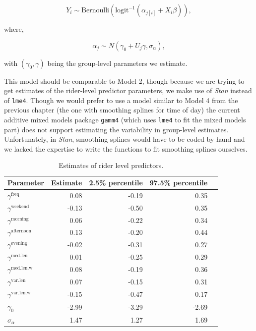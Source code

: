 \documentclass[12pt,twoside]{reedthesis}
\begin{document}
  \begin{equation}
  Y_i \sim \text{Bernoulli} \left( \text{logit}^{-1}
  (\alpha_{j[i]} + X_i \beta) \right),
  \end{equation}
  
  where,
  
  \begin{equation}
  \alpha_j \sim N(\gamma_0 + U_j \gamma, \sigma_\alpha),
  \end{equation}
  
  with \((\gamma_0, \gamma)\) being the group-level parameters we
  estimate.
  
  This model should be comparable to Model 2, though because we are trying
  to get estimates of the rider-level predictor parameters, we make use of
  \textit{Stan} instead of \texttt{lme4}. Though we would prefer to use a
  model similar to Model 4 from the previous chapter (the one with
  smoothing splines for time of day) the current additive mixed models
  package \texttt{gamm4} (which uses \texttt{lme4} to fit the mixed models
  part) does not support estimating the variability in group-level
  estimates. Unfortunately, in \textit{Stan}, smoothing splines would have
  to be coded by hand and we lacked the expertise to write the functions
  to fit smoothing splines ourselves.
  
  \begin{table}[htb]
  \caption{Estimates of rider level predictors. \label{tab:rider-level-estimates}}
  \centering
  \begin{tabular}{lrrrr}
  \toprule
  \textbf{Parameter} & \textbf{Estimate} & \textbf{2.5\% percentile} & \textbf{97.5\% percentile}\\
  \midrule
  $\gamma^\text{freq}$ & 0.08 & -0.19 & 0.35\\
  $\gamma^\text{weekend}$ & -0.13 & -0.50 & 0.35\\
  $\gamma^\text{morning}$ & 0.06 & -0.22 & 0.34\\
  $\gamma^\text{afternoon}$ & 0.13 & -0.20 & 0.44\\
  $\gamma^\text{evening}$ & -0.02 & -0.31 & 0.27\\
  $\gamma^\text{med.len}$ & 0.01 & -0.25 & 0.29\\
  $\gamma^\text{med.len.w}$ & 0.08 & -0.19 & 0.36\\
  $\gamma^\text{var.len}$ & 0.07 & -0.15 & 0.31\\
  $\gamma^\text{var.len.w}$ & -0.15 & -0.47 & 0.17\\
  $\gamma_0$ & -2.99 & -3.29 & -2.69\\
  $\sigma_\alpha$ & 1.47 & 1.27 & 1.69\\
  \bottomrule
  \end{tabular}
  \end{table}
  
\end{document}
